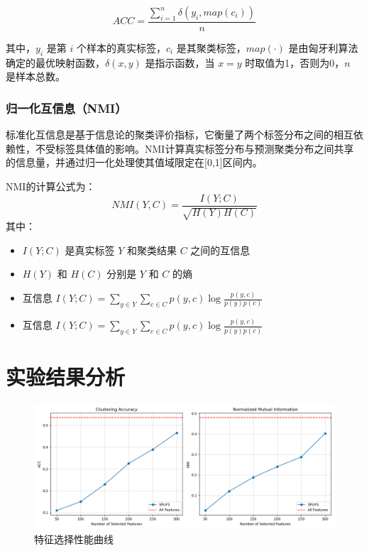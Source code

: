 \documentclass[12pt,a4paper,UTF8]{article}
\begin{document}
 $$
 ACC = \frac{\sum_{i=1}^{n} \delta(y_i, map(c_i))}{n}
 $$
 
 
 其中，$y_i$ 是第 $i$ 个样本的真实标签，$c_i$ 是其聚类标签，$map(\cdot)$ 是由匈牙利算法确定的最优映射函数，$\delta(x,y)$ 是指示函数，当 $x=y$ 时取值为1，否则为0，$n$ 是样本总数。
 \subsubsection{归一化互信息（NMI）}
  标准化互信息是基于信息论的聚类评价指标，它衡量了两个标签分布之间的相互依赖性，不受标签具体值的影响。NMI计算真实标签分布与预测聚类分布之间共享的信息量，并通过归一化处理使其值域限定在[0,1]区间内。
 
 NMI的计算公式为：
 $$
 NMI(Y, C) = \frac{I(Y; C)}{\sqrt{H(Y) H(C)}}
 $$
 其中：
 \begin{itemize}
 	\item $I(Y; C)$ 是真实标签 $Y$ 和聚类结果 $C$ 之间的互信息
 	\item $H(Y)$ 和 $H(C)$ 分别是 $Y$ 和 $C$ 的熵
 	\item 互信息 $I(Y; C) = \sum_{y \in Y} \sum_{c \in C} p(y, c) \log \frac{p(y, c)}{p(y)p(c)}$
 	\item 互信息 $I(Y; C) = \sum_{y \in Y} \sum_{c \in C} p(y, c) \log \frac{p(y, c)}{p(y)p(c)}$
 \end{itemize}
 
 
 \newpage
 
 \section{实验结果分析}

  \begin{figure}[H]
	\centering
	\includegraphics[width=1.0\textwidth]{./results/feature_selection_results}
	\caption{特征选择性能曲线}
	\label{特征选择性能曲线图}
\end{figure}
 
\end{document}
